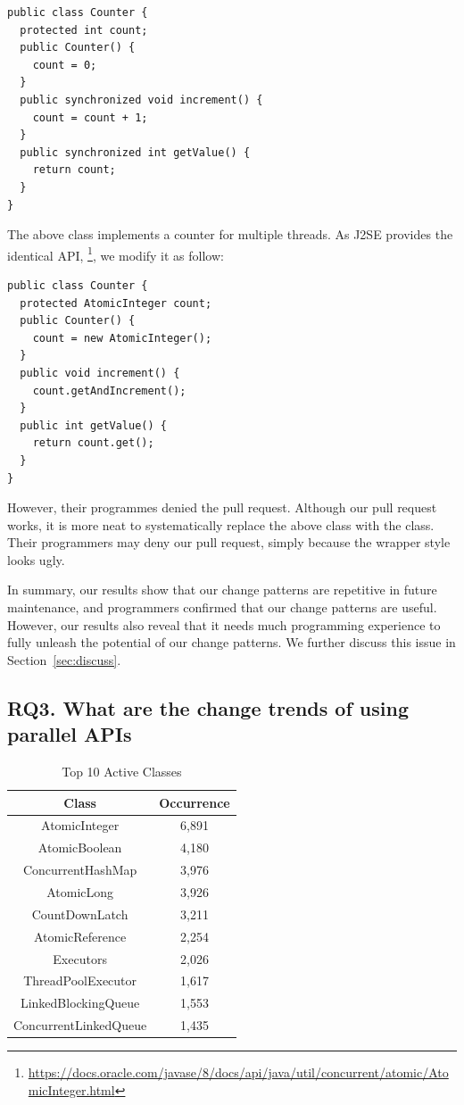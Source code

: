 \begin{lstlisting}
public class Counter {
  protected int count;
  public Counter() {
    count = 0;
  }
  public synchronized void increment() {
    count = count + 1;
  }
  public synchronized int getValue() {
    return count;
  }
}
\end{lstlisting}

The above class implements a counter for multiple threads. As J2SE provides the identical API, \footnote{\url{https://docs.oracle.com/javase/8/docs/api/java/util/concurrent/atomic/AtomicInteger.html}}, we modify it as follow:

\begin{lstlisting}
public class Counter {
  protected AtomicInteger count;
  public Counter() {
    count = new AtomicInteger();
  }
  public void increment() {
    count.getAndIncrement();
  }
  public int getValue() {
    return count.get();
  }
}
\end{lstlisting}

However, their programmes denied the pull request. Although our pull request works, it is more neat to systematically replace the above  class with the  class. Their programmers may deny our pull request, simply because the wrapper style looks ugly.

In summary, our results show that our change patterns are repetitive in future maintenance, and programmers confirmed that our change patterns are useful. However, our results also reveal that it needs much programming experience to fully unleash the potential of our change patterns. We further discuss this issue in Section~\ref{sec:discuss}.

\subsection{RQ3. What are the change trends of using parallel APIs}
\label{sec:result:trend}
\begin{table}
	\centering
	\caption{Top 10 Active Classes}
	\label{table:topapi}
	\begin{tabular}{|c|c|}\hline
		Class&Occurrence\\\hline
		AtomicInteger&6,891\\
		AtomicBoolean&4,180\\
		ConcurrentHashMap&3,976\\
		AtomicLong&3,926\\
		CountDownLatch&3,211\\
		AtomicReference&2,254\\
		Executors&2,026\\
		ThreadPoolExecutor&1,617\\
		LinkedBlockingQueue&1,553\\
		ConcurrentLinkedQueue&1,435\\\hline
	\end{tabular}
\end{table}

